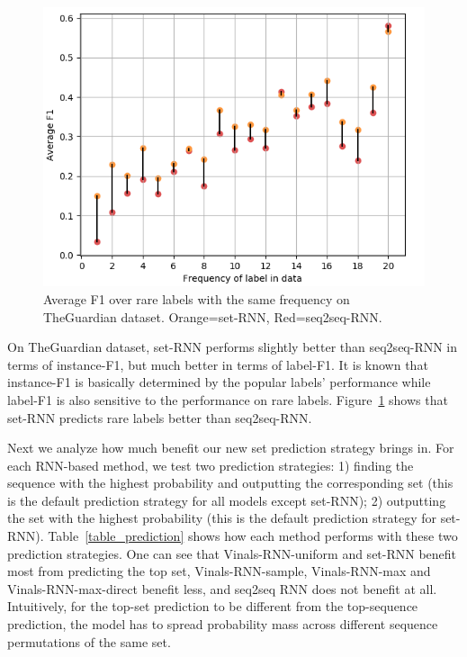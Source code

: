 \begin{figure}[t]
\includegraphics[width=1.0\columnwidth]{figs/labelf1.png}

\caption{Average F1 over rare labels with the same frequency on TheGuardian dataset. Orange=set-RNN, Red=seq2seq-RNN.}
\label{fig:labelf1}
\end{figure}

On TheGuardian dataset, set-RNN performs slightly better than seq2seq-RNN in terms of instance-F1, but much better in terms of label-F1. It is known that instance-F1 is basically determined by the popular labels' performance while label-F1 is also sensitive to the performance on rare labels. Figure~\ref{fig:labelf1} shows that set-RNN predicts rare labels better than seq2seq-RNN.

Next we analyze how much benefit our new set prediction strategy brings in. For each RNN-based method, we test two prediction strategies: 1) finding the sequence with the highest probability and outputting the corresponding set (this is the default prediction strategy for all models except set-RNN); 2) outputting the set with the highest probability (this is the default prediction strategy for set-RNN). Table~\ref{table_prediction} shows how each method performs with these two prediction strategies. One can see that Vinals-RNN-uniform and set-RNN benefit most from predicting the top set,  Vinals-RNN-sample, Vinals-RNN-max and Vinals-RNN-max-direct benefit less, and seq2seq RNN does not benefit at all. Intuitively, for the top-set prediction to be different from the top-sequence prediction, the model has to spread probability mass across different sequence permutations of the same set. 

